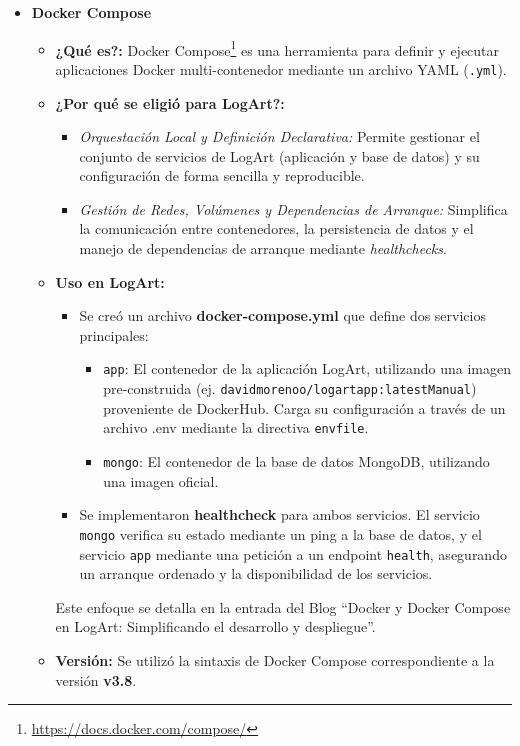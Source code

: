 \begin{itemize}
            \item \textbf{Docker Compose}
                \begin{itemize}
                    \item \textbf{¿Qué es?:} Docker Compose\footnote{\url{https://docs.docker.com/compose/}} es una herramienta para definir y ejecutar aplicaciones Docker multi-contenedor mediante un archivo YAML (\texttt{.yml}).
                    \item \textbf{¿Por qué se eligió para LogArt?:}
                        \begin{itemize}
                            \item \textit{Orquestación Local y Definición Declarativa:} Permite gestionar el conjunto de servicios de LogArt (aplicación y base de datos) y su configuración de forma sencilla y reproducible.
                            \item \textit{Gestión de Redes, Volúmenes y Dependencias de Arranque:} Simplifica la comunicación entre contenedores, la persistencia de datos y el manejo de dependencias de arranque mediante \textit{healthchecks}.
                        \end{itemize}
                    \item \textbf{Uso en LogArt:}
                        \begin{itemize}
                            \item Se creó un archivo \textbf{docker-compose.yml} que define dos servicios principales:
                                \begin{itemize}
                                    \item \texttt{app}: El contenedor de la aplicación LogArt, utilizando una imagen pre-construida (ej. \texttt{davidmorenoo/logartapp:latestManual}) proveniente de DockerHub. Carga su configuración a través de un archivo .env mediante la directiva \texttt{envfile}.
                                    
                                    \item \texttt{mongo}: El contenedor de la base de datos MongoDB, utilizando una imagen oficial.
                                \end{itemize}
                            \item Se implementaron \textbf{healthcheck} para ambos servicios. El servicio \texttt{mongo} verifica su estado mediante un ping a la base de datos, y el servicio \texttt{app} mediante una petición a un endpoint \texttt{health}, asegurando un arranque ordenado y la disponibilidad de los servicios.
                        \end{itemize}
                    Este enfoque se detalla en la entrada del Blog ``Docker y Docker Compose en LogArt: Simplificando el desarrollo y despliegue''\cite{MorenoDockerLogArt}.

                    \item \textbf{Versión:} Se utilizó la sintaxis de Docker Compose correspondiente a la versión \textbf{v3.8}.
                \end{itemize}
                
    \end{itemize}


